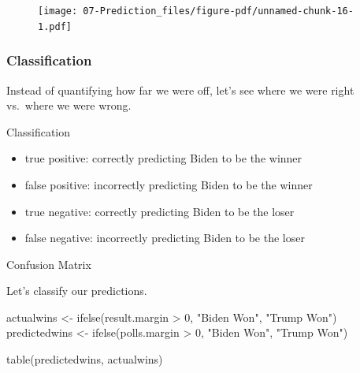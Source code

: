 \documentclass[
  letterpaper,
  DIV=11,
  numbers=noendperiod]{scrreprt}
\newenvironment{Shaded}{\begin{snugshade}}{\end{snugshade}}
\newcommand{\DecValTok}[1]{\textcolor[rgb]{0.68,0.00,0.00}{#1}}
\newcommand{\FunctionTok}[1]{\textcolor[rgb]{0.28,0.35,0.67}{#1}}
\newcommand{\NormalTok}[1]{\textcolor[rgb]{0.00,0.23,0.31}{#1}}
\newcommand{\OtherTok}[1]{\textcolor[rgb]{0.00,0.23,0.31}{#1}}
\newcommand{\SpecialCharTok}[1]{\textcolor[rgb]{0.37,0.37,0.37}{#1}}
\newcommand{\StringTok}[1]{\textcolor[rgb]{0.13,0.47,0.30}{#1}}
\providecommand{\tightlist}{%
  \setlength{\itemsep}{0pt}\setlength{\parskip}{0pt}}\usepackage{longtable,booktabs,array}
\begin{document}
\begin{figure}[H]

{\centering \texttt{[image: 07-Prediction\_files/figure-pdf/unnamed-chunk-16-1.pdf]}

}

\end{figure}

\hypertarget{classification}{%
\subsubsection{Classification}\label{classification}}

Instead of quantifying how far we were off, let's see where we were
right vs.~where we were wrong.

Classification

\begin{itemize}
\tightlist
\item
  true positive: correctly predicting Biden to be the winner
\item
  false positive: incorrectly predicting Biden to be the winner
\item
  true negative: correctly predicting Biden to be the loser
\item
  false negative: incorrectly predicting Biden to be the loser
\end{itemize}

Confusion Matrix

Let's classify our predictions.

\begin{Shaded}
\begin{Highlighting}[]
\NormalTok{actualwins }\OtherTok{\textless{}{-}} \FunctionTok{ifelse}\NormalTok{(result.margin }\SpecialCharTok{\textgreater{}} \DecValTok{0}\NormalTok{, }\StringTok{"Biden Won"}\NormalTok{, }\StringTok{"Trump Won"}\NormalTok{)}
\NormalTok{predictedwins }\OtherTok{\textless{}{-}} \FunctionTok{ifelse}\NormalTok{(polls.margin }\SpecialCharTok{\textgreater{}} \DecValTok{0}\NormalTok{, }\StringTok{"Biden Won"}\NormalTok{, }\StringTok{"Trump Won"}\NormalTok{)}
\end{Highlighting}
\end{Shaded}

\begin{Shaded}
\begin{Highlighting}[]
\FunctionTok{table}\NormalTok{(predictedwins, actualwins)}
\end{Highlighting}
\end{Shaded}
\end{document}
